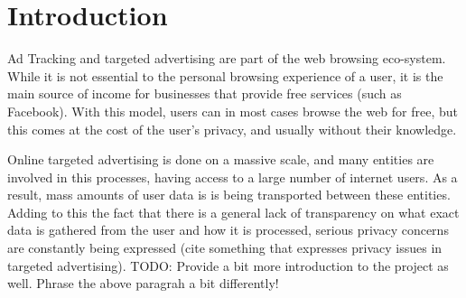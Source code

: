 \documentclass{l4proj}
\begin{document}
%
%
%
%
%
%
%
%
\chapter{Introduction}


Ad Tracking and targeted advertising are part of the web browsing eco-system. While it is not essential to the personal browsing experience of a user, it is the main source of income for businesses that provide free services (such as Facebook). With this model, users can in most cases browse the web for free, but this comes at the cost of the user's privacy, and usually without their knowledge. 

Online targeted advertising is done on a massive scale, and many entities are involved in this processes, having access to a large number of internet users. As a result, mass amounts of user data is is being transported between these entities. Adding to this the fact that there is a general lack of transparency on what exact data is gathered from the user and how it is processed, serious privacy concerns are constantly being expressed (cite something that expresses privacy issues in targeted advertising).
TODO: Provide a bit more introduction to the project as well. Phrase the above paragrah a bit differently!
\end{document}
